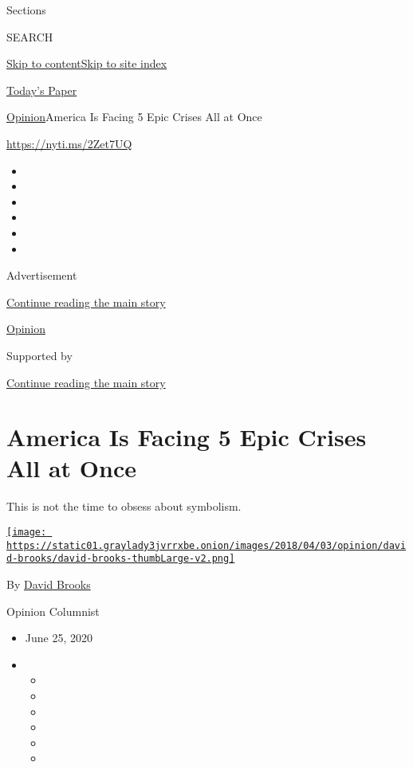 Sections

SEARCH

\protect\hyperlink{site-content}{Skip to
content}\protect\hyperlink{site-index}{Skip to site index}

\href{https://myaccount.nytimes3xbfgragh.onion/auth/login?response_type=cookie\&client_id=vi}{}

\href{https://www.nytimes3xbfgragh.onion/section/todayspaper}{Today's
Paper}

\href{/section/opinion}{Opinion}\textbar{}America Is Facing 5 Epic
Crises All at Once

\url{https://nyti.ms/2Zet7UQ}

\begin{itemize}
\item
\item
\item
\item
\item
\item
\end{itemize}

Advertisement

\protect\hyperlink{after-top}{Continue reading the main story}

\href{/section/opinion}{Opinion}

Supported by

\protect\hyperlink{after-sponsor}{Continue reading the main story}

\hypertarget{america-is-facing-5-epic-crises-all-at-once}{%
\section{America Is Facing 5 Epic Crises All at
Once}\label{america-is-facing-5-epic-crises-all-at-once}}

This is not the time to obsess about symbolism.

\href{https://www.nytimes3xbfgragh.onion/by/david-brooks}{\texttt{[image: https://static01.graylady3jvrrxbe.onion/images/2018/04/03/opinion/david-brooks/david-brooks-thumbLarge-v2.png]}}

By \href{https://www.nytimes3xbfgragh.onion/by/david-brooks}{David
Brooks}

Opinion Columnist

\begin{itemize}
\item
  June 25, 2020
\item
  \begin{itemize}
  \item
  \item
  \item
  \item
  \item
  \item
  \end{itemize}
\end{itemize}

